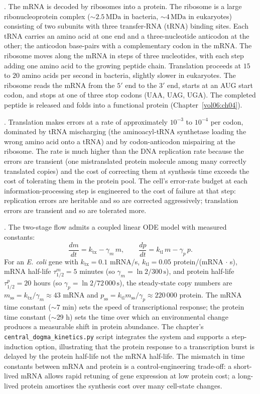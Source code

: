 . The mRNA is decoded by ribosomes into a
protein. The ribosome is a large ribonucleoprotein complex
($\sim 2.5\,\text{MDa}$ in bacteria, $\sim 4\,\text{MDa}$ in
eukaryotes) consisting of two subunits with three transfer-RNA
(tRNA) binding sites. Each tRNA carries an amino acid at one end and
a three-nucleotide anticodon at the other; the anticodon base-pairs
with a complementary codon in the mRNA. The ribosome moves along the
mRNA in steps of three nucleotides, with each step adding one amino
acid to the growing peptide chain. Translation proceeds at
$15$ to $20$ amino acids per second in bacteria, slightly slower in
eukaryotes. The ribosome reads the mRNA from the $5'$ end to the
$3'$ end, starts at an AUG start codon, and stops at one of three
stop codons (UAA, UAG, UGA). The completed peptide is released and
folds into a functional protein (Chapter~\ref{vol06:ch04}).

. Translation makes errors at a rate of
approximately $10^{-3}$ to $10^{-4}$ per codon, dominated by tRNA
mischarging (the aminoacyl-tRNA synthetase loading the wrong amino
acid onto a tRNA) and by codon-anticodon mispairing at the ribosome.
The rate is much higher than the DNA replication rate because the
errors are transient (one mistranslated protein molecule among many
correctly translated copies) and the cost of correcting them at
synthesis time exceeds the cost of tolerating them in the protein
pool. The cell's error-rate budget at each information-processing
step is engineered to the cost of failure at that step: replication
errors are heritable and so are corrected aggressively; translation
errors are transient and so are tolerated more.

. The two-stage
flow admits a coupled linear ODE model with measured constants:
\[
\frac{dm}{dt} = k_\text{tx} - \gamma_m\, m,
\qquad
\frac{dp}{dt} = k_\text{tl}\, m - \gamma_p\, p.
\]
For an \emph{E. coli} gene with $k_\text{tx} = 0.1$ mRNA/s,
$k_\text{tl} = 0.05$ protein/(mRNA $\cdot$ s), mRNA half-life
$\tau_{1/2}^m = 5$ minutes (so $\gamma_m = \ln 2/300\,\text{s}$), and
protein half-life $\tau_{1/2}^p = 20$ hours (so
$\gamma_p = \ln 2/72\,000\,\text{s}$), the steady-state copy numbers
are $m_\text{ss} = k_\text{tx}/\gamma_m \approx 43$ mRNA and
$p_\text{ss} = k_\text{tl} m_\text{ss}/\gamma_p \approx 220\,000$
protein. The mRNA time constant ($\sim 7$ min) sets the speed of
transcriptional response; the protein time constant ($\sim 29$ h) sets
the time over which an environmental change produces a measurable
shift in protein abundance. The chapter's
\texttt{central\_dogma\_kinetics.py} script integrates the system
and supports a step-induction option, illustrating that the protein
response to a transcription burst is delayed by the protein half-life
not the mRNA half-life. The mismatch in time constants between mRNA
and protein is a control-engineering trade-off: a short-lived mRNA
allows rapid retuning of gene expression at low protein cost; a
long-lived protein amortises the synthesis cost over many cell-state
changes.

